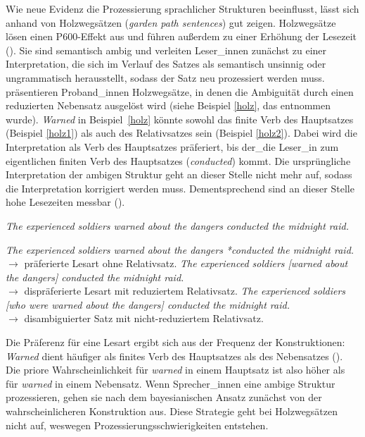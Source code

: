  Wie neue Evidenz die Prozessierung sprachlicher Strukturen beeinflusst, lässt sich anhand von Holzwegsätzen (\textit{garden path sentences}) gut zeigen. Holzwegsätze lösen einen P600-Effekt aus und führen außerdem zu einer Erhöhung der Lesezeit (\cite{Tabor.2000}). Sie sind semantisch ambig und verleiten Leser\_innen zunächst zu einer Interpretation, die sich im Verlauf des Satzes als semantisch unsinnig oder ungrammatisch herausstellt, sodass der Satz neu prozessiert werden muss. \textcite{Fine.2013} präsentieren Proband\_innen Holzwegsätze, in denen die Ambiguität durch einen reduzierten Nebensatz ausgelöst wird (siehe Beispiel \ref{holz}, das \cite[2283]{Fine.2013} entnommen wurde). \textit{Warned} in Beispiel~\ref{holz} könnte sowohl das finite Verb des Hauptsatzes (Beispiel \ref{holz1}) als auch des Relativsatzes sein (Beispiel \ref{holz2}). Dabei wird die Interpretation als Verb des Hauptsatzes präferiert, bis der\_die Leser\_in zum eigentlichen finiten Verb des Hauptsatzes (\textit{conducted}) kommt. Die ursprüngliche Interpretation der ambigen Struktur geht an dieser Stelle nicht mehr auf, sodass die Interpretation korrigiert werden muss. Dementsprechend sind an dieser Stelle hohe Lesezeiten messbar (\cite[2279--2280]{Fine.2013}).   

\begin{exe}
\ex\label{holz} \textit{The experienced soldiers warned about the dangers conducted the midnight raid.}
\begin{xlist}
\ex\label{holz1} \textit{The experienced soldiers warned about the dangers *conducted the midnight raid.}\\
$\rightarrow$ präferierte Lesart ohne Relativsatz.
\ex\label{holz2} \textit{The experienced soldiers [warned about the dangers] conducted the midnight raid.}\\
$\rightarrow$ dispräferierte Lesart mit reduziertem Relativsatz.
\ex\label{holz3} \textit{The experienced soldiers [who were warned about the dangers] conducted the midnight raid.}\\
$\rightarrow$ disambiguierter Satz mit nicht-reduziertem Relativsatz.
\end{xlist}
\end{exe}

Die Präferenz für eine Lesart ergibt sich aus der Frequenz der Konstruktionen: \textit{Warned} dient häufiger als finites Verb des Hauptsatzes als des Nebensatzes (\cite[2280]{Fine.2013}). Die priore Wahrscheinlichkeit für \textit{warned} in einem Hauptsatz ist also höher als für \textit{warned} in einem Nebensatz. Wenn Sprecher\_innen eine ambige Struktur prozessieren, gehen sie nach dem bayesianischen Ansatz zunächst von der wahrscheinlicheren Konstruktion aus. Diese Strategie geht bei Holzwegsätzen nicht auf, weswegen Prozessierungsschwierigkeiten entstehen. 

